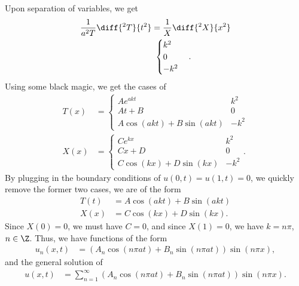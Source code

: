 \documentclass[10pt]{mypackage}
\begin{document}
\RaggedRight
\begin{solution}[12.4, Problem 6]
  Upon separation of variables, we get
  \begin{align*}
    \frac{1}{a^2 T}\diff{^2T}{t^2} &= \frac{1}{X}\diff{^2X}{x^2}\\
                               &\ \begin{cases}
                                 k^2\\
                                 0\\
                                 -k^2
                               \end{cases}.
  \end{align*}
  Using some black magic, we get the cases of
  \begin{align*}
    T(x) &= \begin{cases}
      Ae^{akt} & k^2\\
      At + B & 0\\
      A\cos\left( akt \right) + B\sin\left( akt \right) & -k^2
    \end{cases}\\
    X(x) &= \begin{cases}
      Ce^{kx} & k^2\\
      Cx + D & 0\\
      C\cos\left( kx \right) + D\sin\left( kx \right) & -k^2
    \end{cases}.
  \end{align*}
  By plugging in the boundary conditions of $u(0,t) = u\left( 1,t \right) = 0$, we quickly remove the former two cases, we are of the form
  \begin{align*}
    T(t) &= A\cos\left( akt \right) + B\sin\left( akt \right)\\
    X(x) &= C\cos\left( kx \right) + D\sin\left( kx \right).
  \end{align*}
  Since $X(0) = 0$, we must have $C = 0$, and since $X(1) = 0$, we have $k= n\pi$, $n\in\Z$. Thus, we have functions of the form
  \begin{align*}
    u_n\left( x,t \right) &= \left( A_n\cos\left( n\pi at \right) + B_n\sin\left( n\pi at \right) \right) \sin\left( n\pi x \right),
  \end{align*}
  and the general solution of
  \begin{align*}
    u\left( x,t \right) &= \sum_{n=1}^{\infty} \left( A_n\cos\left( n\pi a t \right) + B_n\sin\left( n\pi a t \right) \right)\sin\left( n\pi x \right).
  \end{align*}

\end{solution}
\end{document}

